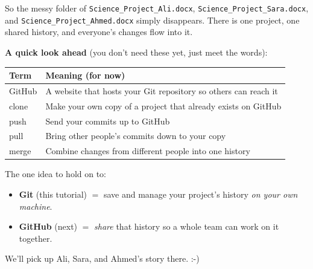 \documentclass[11pt,a4paper]{article}
\begin{document}
So the messy folder of \texttt{Science\_Project\_Ali.docx},
\texttt{Science\_Project\_Sara.docx}, and \texttt{Science\_Project\_Ahmed.docx}
simply disappears. There is one project, one shared history, and everyone's
changes flow into it.

\bigskip
\noindent\textbf{A quick look ahead} (you don't need these yet, just meet the words):

\begin{center}
\begin{tabular}{|l|l|}
\hline
\textbf{Term} & \textbf{Meaning (for now)} \\
\hline
GitHub & A website that hosts your Git repository so others can reach it \\
\hline
clone  & Make your own copy of a project that already exists on GitHub \\
\hline
push   & Send your commits up to GitHub \\
\hline
pull   & Bring other people's commits down to your copy \\
\hline
merge  & Combine changes from different people into one history \\
\hline
\end{tabular}
\end{center}

\bigskip
\noindent The one idea to hold on to:

\begin{itemize}
  \item \textbf{Git} (this tutorial) $=$ save and manage your project's history
        \emph{on your own machine}.
  \item \textbf{GitHub} (next) $=$ \emph{share} that history so a whole team can
        work on it together.
\end{itemize}

We'll pick up Ali, Sara, and Ahmed's story there. :-)



\end{document}
